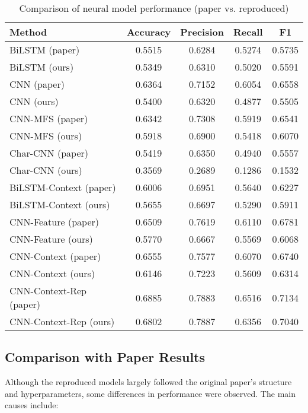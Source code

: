 \documentclass{article}
\begin{document}
\begin{table}[htbp]
\centering
\caption{Comparison of neural model performance (paper vs. reproduced)}
\label{tab:neural-results}
\begin{tabular}{lcccc}
\toprule
\textbf{Method} & \textbf{Accuracy} & \textbf{Precision} & \textbf{Recall} & \textbf{F1} \\
\midrule
BiLSTM (paper)         & 0.5515 & 0.6284 & 0.5274 & 0.5735 \\
BiLSTM (ours)          & 0.5349 & 0.6310 & 0.5020 & 0.5591 \\
CNN (paper)            & 0.6364 & 0.7152 & 0.6054 & 0.6558 \\
CNN (ours)             & 0.5400 & 0.6320 & 0.4877 & 0.5505 \\
CNN-MFS (paper)        & 0.6342 & 0.7308 & 0.5919 & 0.6541 \\
CNN-MFS (ours)         & 0.5918 & 0.6900 & 0.5418 & 0.6070 \\
Char-CNN (paper)       & 0.5419 & 0.6350 & 0.4940 & 0.5557 \\
Char-CNN (ours)        & 0.3569 & 0.2689 & 0.1286 & 0.1532 \\
BiLSTM-Context (paper) & 0.6006 & 0.6951 & 0.5640 & 0.6227 \\
BiLSTM-Context (ours)  & 0.5655 & 0.6697 & 0.5290 & 0.5911 \\
CNN-Feature (paper)    & 0.6509 & 0.7619 & 0.6110 & 0.6781 \\
CNN-Feature (ours)     & 0.5770 & 0.6667 & 0.5569 & 0.6068 \\
CNN-Context (paper)    & 0.6555 & 0.7577 & 0.6070 & 0.6740 \\
CNN-Context (ours)     & 0.6146 & 0.7223 & 0.5609 & 0.6314 \\
CNN-Context-Rep (paper)& 0.6885 & 0.7883 & 0.6516 & 0.7134 \\
CNN-Context-Rep (ours) & 0.6802 & 0.7887 & 0.6356 & 0.7040 \\
\bottomrule
\end{tabular}
\end{table}

\subsection{Comparison with Paper Results}

Although the reproduced models largely followed the original paper’s structure and hyperparameters, some differences in performance were observed. The main causes include:
\end{document}
